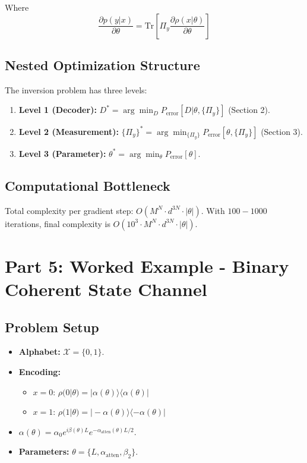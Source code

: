 \documentclass[11pt,a4paper]{article}
\begin{document}
Where 
\begin{equation}
\frac{\partial p(y|x)}{\partial\theta} = \text{Tr}\left[\Pi_y \frac{\partial\rho(x|\theta)}{\partial\theta}\right]
\end{equation}

\subsection{Nested Optimization Structure}

The inversion problem has three levels:
\begin{enumerate}
    \item \textbf{Level 1 (Decoder):} $D^* = \arg\min_D P_{\text{error}}[D|\theta, \{\Pi_y\}]$ (Section 2).
    \item \textbf{Level 2 (Measurement):} $\{\Pi_y\}^* = \arg\min_{\{\Pi_y\}} P_{\text{error}}[\theta, \{\Pi_y\}]$ (Section 3).
    \item \textbf{Level 3 (Parameter):} $\theta^* = \arg\min_\theta P_{\text{error}}[\theta]$.
\end{enumerate}

\subsection{Computational Bottleneck}

Total complexity per gradient step: $O(M^N \cdot d^{3N} \cdot |\theta|)$. With $100-1000$ iterations, final complexity is $O(10^3 \cdot M^N \cdot d^{3N} \cdot |\theta|)$.

\section{Part 5: Worked Example - Binary Coherent State Channel}

\subsection{Problem Setup}

\begin{itemize}
    \item \textbf{Alphabet:} $\mathcal{X} = \{0, 1\}$.
    \item \textbf{Encoding:}
    \begin{itemize}
        \item $x = 0$: $\rho(0|\theta) = |\alpha(\theta)\rangle\langle\alpha(\theta)|$
        \item $x = 1$: $\rho(1|\theta) = |-\alpha(\theta)\rangle\langle-\alpha(\theta)|$
    \end{itemize}
    \item $\alpha(\theta) = \alpha_0 e^{i\beta(\theta)L} e^{-\alpha_{\text{atten}}(\theta)L/2}$.
    \item \textbf{Parameters:} $\theta = \{L, \alpha_{\text{atten}}, \beta_2\}$.
\end{itemize}
\end{document}
